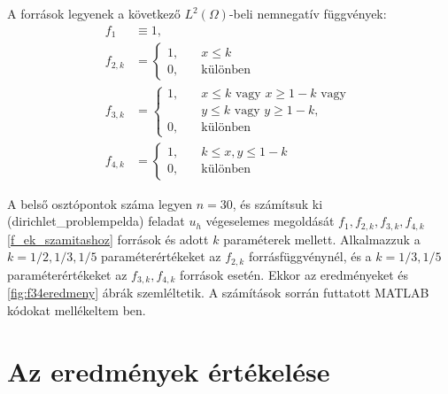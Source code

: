 A források legyenek a következő $L^2(\Omega)$-beli nemnegatív függvények:
\begin{equation}\label{f_ek_szamitashoz}
	\begin{aligned}
	f_1 &\equiv 1, \\
	f_{2,k} &= \begin{cases} 1, &\quad  x \leq k \\  0, &\quad \text{különben} \end{cases} 	\\
	f_{3,k} &= \begin{cases} 1, &\quad  x \leq k \text{ vagy } x \geq 1-k  \text{ vagy }\\
								&\quad y \leq k \text{ vagy } y \geq 1-k,\\  
							 0, &\quad \text{különben}\end{cases} 		\\
	f_{4,k} &= \begin{cases} 1, &\quad k \leq x, y \leq 1-k \\  0, &\quad \text{különben}\end{cases} 		
	\end{aligned}
\end{equation}



A belső osztópontok száma legyen $n = 30$, és számítsuk ki \aref({dirichlet_problempelda}) feladat $u_h$ végeselemes megoldását $f_1, f_{2,k}, f_{3,k}, f_{4,k}$ \eqref{f_ek_szamitashoz}  források és adott $k$ paraméterek  mellett. Alkalmazzuk a $k = 1/2, 1/3, 1/5$ paraméterértékeket az $f_{2,k}$ forrásfüggvénynél, és a $k = 1/3, 1/5$ paraméterértékeket az $ f_{3,k}, f_{4,k}$ források esetén. Ekkor az eredményeket  és \ref{fig:f34eredmeny} ábrák szemléltetik. A számítások sorrán futtatott MATLAB kódokat mellékeltem ben. 

\section{Az eredmények értékelése}

